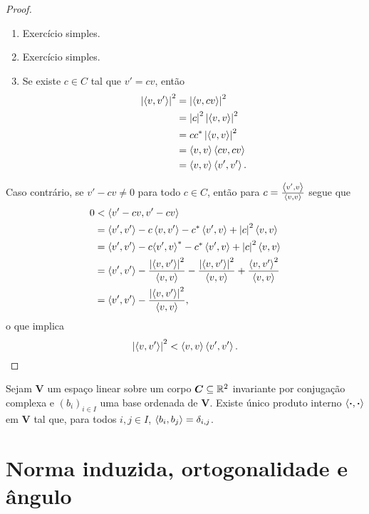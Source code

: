 \begin{proof}
	\begin{enumerate}
	\item Exercício simples.
	\item Exercício simples.
	\item Se existe $c \in C$ tal que $v'=cv$, então
		\begin{align*}
		\abs{\inte{v}{v'}}^2 &= \abs{\inte{v}{cv}}^2 \\
			&= \abs{c}^2\abs{\inte{v}{v}}^2 \\
			&= c\conju{c}\abs{\inte{v}{v}}^2 \\
			&= \inte{v}{v}\inte{cv}{cv} \\
			&= \inte{v}{v}\inte{v'}{v'}.
		\end{align*}
	\end{enumerate}

Caso contrário, se $v'-cv \neq 0$ para todo $c \in C$, então para $c=\frac{\inte{v'}{v}}{\inte{v}{v}}$ segue que
	\begin{align*}
	0 &< \inte{v'-cv}{v'-cv} \\
		&= \inte{v'}{v'} - c\inte{v}{v'} - \conju{c}\inte{v'}{v} + \abs{c}^2\inte{v}{v} \\
		&= \inte{v'}{v'} - c\conju{\inte{v'}{v}} - \conju{c}\inte{v'}{v} + \abs{c}^2\inte{v}{v} \\
		&= \inte{v'}{v'} - \frac{\abs{\inte{v}{v'}}^2}{\inte{v}{v}} - \frac{\abs{\inte{v}{v'}}^2}{\inte{v}{v}} + \frac{\inte{v}{v'}^2}{\inte{v}{v}} \\
		&=  \inte{v'}{v'} - \frac{\abs{\inte{v}{v'}}^2}{\inte{v}{v}},
	\end{align*}
o que implica
	\begin{equation*}
	\abs{\inte{v}{v'}}^2 < \inte{v}{v}\inte{v'}{v'}.
	\end{equation*}
\end{proof}

\begin{proposition}
Sejam $\bm V$ um espaço linear sobre um corpo $\bm C \subseteq \R^2$ invariante por conjugação complexa e $(b_i)_{i \in I}$ uma base ordenada de $\bm V$. Existe único produto interno $\inte{\var}{\var}$ em $\bm V$ tal que, para todos $i,j \in I$, $\inte{b_i}{b_j}=\delta_{i,j}$.
\end{proposition}

\section{Norma induzida, ortogonalidade e ângulo}

